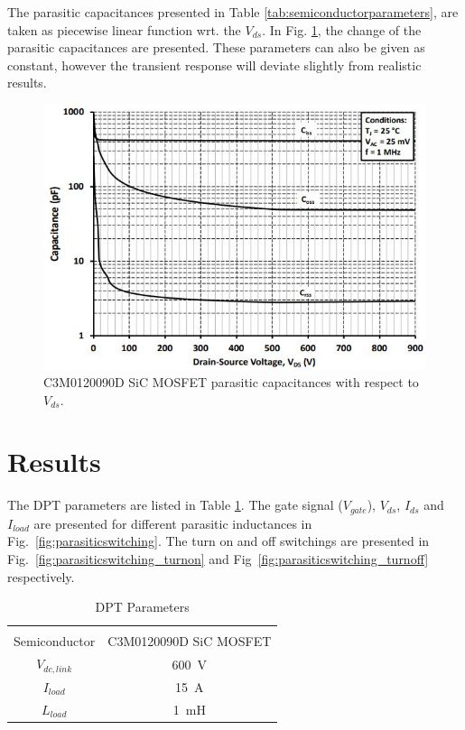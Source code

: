 \documentclass[12pt]{article} %
\begin{document}
The parasitic capacitances presented in Table \ref{tab:semiconductorparameters}, are taken as piecewise linear function wrt. the $V_{ds}$. In Fig. \ref{fig:parasiticcapacitance}, the change of the parasitic capacitances are presented. These parameters can also be given as constant, however the transient response will deviate slightly from realistic results.

\begin{figure}[h!]
\centering	\includegraphics[scale=0.6]{figures/Parasitic_capacitance.JPG}
	\caption{C3M0120090D SiC MOSFET parasitic capacitances with respect to $V_{ds}$.\cite{Cree} }
	\label{fig:parasiticcapacitance}
\end{figure}

\section{Results}
The DPT parameters are listed in Table \ref{tab:DPTpar}. The gate signal ($V_{gate}$), $V_{ds}$, $I_{ds}$ and $I_{load}$ are presented for different parasitic inductances in Fig.~\ref{fig:parasiticswitching}. The turn on and off switchings are presented in Fig.~\ref{fig:parasiticswitching_turnon} and Fig~\ref{fig:parasiticswitching_turnoff} respectively.

\begin{table}[h]
\centering
\caption{DPT Parameters}
\label{tab:DPTpar}
\begin{tabular}{cc}
\hline \\
Semiconductor      &   C3M0120090D SiC MOSFET   \\
$V_{dc,link}$      &   600~V   \\
$I_{load}$      &   15~A   \\
$L_{load}$      &   1~mH   \\
\hline
\end{tabular}
\end{table}
\end{document}

